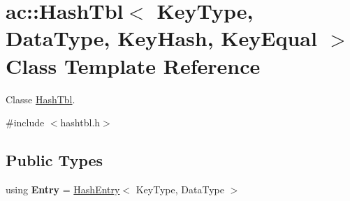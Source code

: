 \hypertarget{classac_1_1_hash_tbl}{}\section{ac\+:\+:Hash\+Tbl$<$ Key\+Type, Data\+Type, Key\+Hash, Key\+Equal $>$ Class Template Reference}
\label{classac_1_1_hash_tbl}


Classe \hyperlink{classac_1_1_hash_tbl}{Hash\+Tbl}.  




{\ttfamily \#include $<$hashtbl.\+h$>$}

\subsection*{Public Types}
\begin{DoxyCompactItemize}
\item 
\mbox{\label{classac_1_1_hash_tbl_a76da632822e2390a744f4f99be68a9d5}} 
using {\bfseries Entry} = \hyperlink{classac_1_1_hash_entry}{Hash\+Entry}$<$ Key\+Type, Data\+Type $>$
\end{DoxyCompactItemize}
